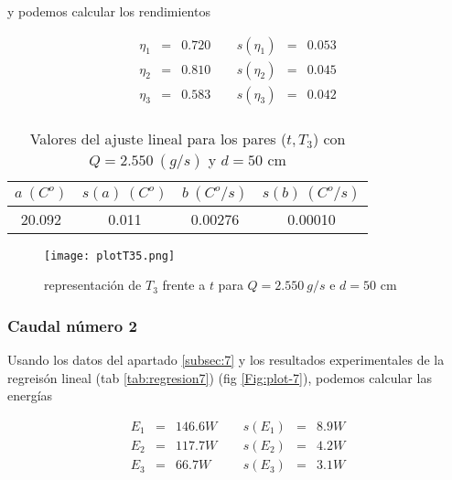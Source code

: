 \documentclass[12pt,a4paper]{article}
\begin{document}
 y podemos calcular los rendimientos 
 
\begin{equation} 
\begin{array}{lllllll}
\eta_1 & = & 0.720  &  \ \ &  s(\eta_1) & =  & 0.053   \\ 
 \eta_2 & = & 0.810  &  \ \ &  s(\eta_2) & =  & 0.045   \\ 
 \eta_3 & = & 0.583  &  \ \ &  s(\eta_3) & =  & 0.042   \\ 
 \end{array} 
\end{equation} 
 
 \begin{table}[h!] 	 \centering 
\begin{tabular}{|c|c|c|c|} 
\hline 
$a \ (C^o)$ & $s(a) \ (C^o)$ & $ b \ (C^o/s)$ & $s(b) \ (C^o/s)$  \\ \hline 
20.092  & 0.011 &  0.00276 & 0.00010 \\ 
\hline
\end{tabular} 
\caption{Valores del ajuste lineal para los pares ($t,T_3$) con $Q=2.550 \ (g/s)$ y $d= 50 $ cm} 
\label{tab:regresion6} 
\end{table} 
 
 
\begin{figure}[h!] 	 \centering 
\texttt{[image: plotT35.png]} 
\caption{representación de $T_3$ frente a $t$ para $Q = 2.550 \ g/s$ e $d = 50$ cm} 
\label{Fig:plot-6}  
\end{figure} 
 
\newpage 
 
 
 
 
\subsubsection{Caudal número 2} 
 
Usando los datos del apartado \ref{subsec:7} y los  resultados experimentales de la regreisón lineal (tab \ref{tab:regresion7}) (fig \ref{Fig:plot-7}), podemos calcular las energías 
 
 \begin{equation} 
\begin{array}{lllllll}
E_1 & = & 146.6 W &  \ \ &  s(E_1) & =  & 8.9  W \\ 
 E_2 & = & 117.7 W &  \ \ &  s(E_2) & =  & 4.2  W \\ 
 E_3 & = & 66.7 W &  \ \ &  s(E_3) & =  & 3.1  W \\ 
 \end{array} 
\end{equation} 
 
\end{document}
